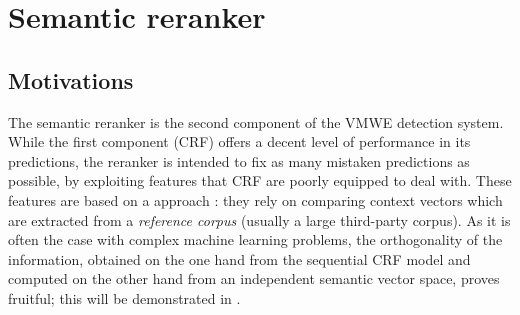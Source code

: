 \documentclass[output=paper,modfonts,nonflat]{langsci/langscibook}
\begin{document}






\section{\label{subsec:Sem}Semantic reranker}
\subsection{Motivations}

The semantic reranker
 is the second component of the VMWE detection
system. While the first component (CRF) offers a decent level of
performance in its predictions, the reranker is intended to fix as
many mistaken predictions as possible, by exploiting features that CRF
are poorly equipped to deal with. These features are based on a
 approach \citep{schutze1998,maldonado2011}:
they rely on comparing context vectors which are extracted from a {\em
  reference corpus} (usually a large third-party corpus). As it is
often the case with complex machine learning problems, the
orthogonality of the information, obtained on the one hand from the
sequential CRF model and computed on the other hand from an independent
semantic vector space, proves fruitful; this will be demonstrated in
.
\end{document}
